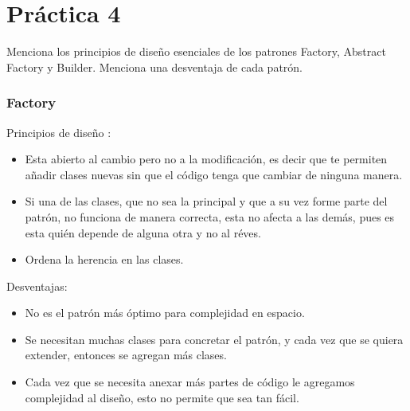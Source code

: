\documentclass{article}
\begin{document}

\section*{\LARGE{Práctica 4}}

Menciona los principios de diseño esenciales de los patrones Factory, Abstract Factory y Builder.
Menciona una desventaja de cada patrón.

\subsubsection*{Factory}
Principios de diseño :
\newcommand{\localtextbulletone}{\textcolor{black}{\raisebox{.45ex}{\rule{.6ex}{.6ex}}}}
\renewcommand{\labelitemi}{\localtextbulletone}
\begin{itemize}
\item Esta abierto al cambio pero no a la modificación, es decir que te permiten añadir
  clases nuevas sin que el código tenga que cambiar de ninguna manera.
\item Si una de las clases, que no sea la principal y que a su vez forme parte del patrón,
  no funciona de manera correcta, esta no afecta a las demás, pues es esta quién depende de
  alguna otra y no al réves.
\item Ordena la herencia en las clases.
\end{itemize}
Desventajas:
\begin{itemize}
\item No es el patrón más óptimo para complejidad en espacio.
\item Se necesitan muchas clases para concretar el patrón, y cada vez que se quiera extender,
  entonces se agregan más clases.
\item Cada vez que se necesita anexar más partes de código le agregamos complejidad al diseño,
  esto no permite que sea tan fácil.
\end{itemize}
\end{document}
